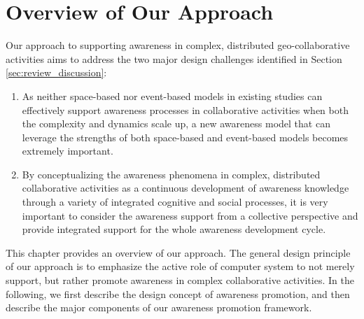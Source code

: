 \graphicspath{{Figures/}}

\chapter{Overview of Our Approach} %
\label{cha:our_approach_overview}

Our approach to supporting awareness in complex, distributed geo-collaborative activities aims to address the two major design challenges identified in Section \ref{sec:review_discussion}: 

\begin{enumerate}
   \item As neither space-based nor event-based models in existing studies can effectively support awareness processes in collaborative activities when both the complexity and dynamics scale up, a new awareness model that can leverage the strengths of both space-based and event-based models becomes extremely important.
   \item By conceptualizing the awareness phenomena in complex, distributed collaborative activities as a continuous development of awareness knowledge through a variety of integrated cognitive and social processes, it is very important to consider the awareness support from a collective perspective and provide integrated support for the whole awareness development cycle.
\end{enumerate}

This chapter provides an overview of our approach. The general design principle of our approach is to emphasize the active role of computer system to not merely support, but rather promote awareness in complex collaborative activities. In the following, we first describe the design concept of awareness promotion, and then describe the major components of our awareness promotion framework.

